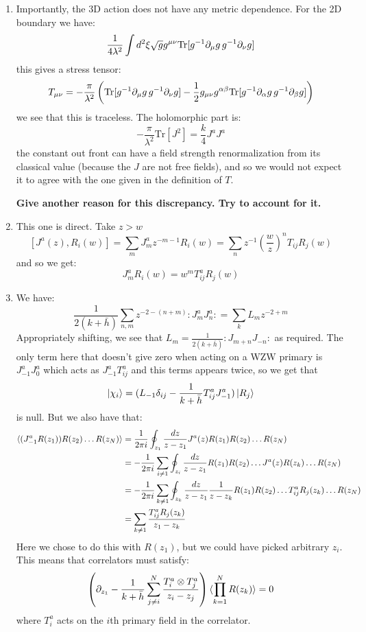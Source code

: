\documentclass[11pt]{article}
\begin{document}
\begin{enumerate}
	\item Importantly, the 3D action does not have any metric dependence. For the 2D boundary we have:
	\[
		\frac{1}{4 \lambda^2} \int d^2 \xi \sqrt{g} g^{\mu \nu} \mathrm{Tr}[g^{-1}\partial_\mu g\, g^{-1} \partial_\nu g]
	\]
	this gives a stress tensor:
	\[
		T_{\mu \nu} = - \frac{\pi}{\lambda^2} \left(\mathrm{Tr}[g^{-1}\partial_\mu g\, g^{-1} \partial_\nu g] - \frac12 g_{\mu \nu} g^{\alpha \beta} \mathrm{Tr}[g^{-1}\partial_\alpha g\, g^{-1} \partial_\beta g] \right)
	\]
	we see that this is traceless. The holomorphic part is:
	\[
		- \frac{\pi}{\lambda^2} \mathrm{Tr}[J^2] = \frac{k}{4} J^a J^a
	\]
	the constant out front can have a field strength renormalization from its classical value (because the $J$ are not free fields), and so we would not expect it to agree with the one given in the definition of $T$.
	
	\textbf{Give another reason for this discrepancy. Try to account for it.}
	
	\item This one is direct. Take $z > w$
	\[
		[J^a(z), R_i(w)] = \sum_{m} J^a_m z^{-m-1} R_i (w) = \sum_{n} z^{-1} \left(\frac wz \right)^n T_{ij} R_j(w)
	\]
	and so we get:
	\[
		J^a_m R_i(w) = w^m T^a_{ij} R_j(w)
	\]
	
	\item We have:
	\[
		\frac{1}{2(k+\bar h)} \sum_{n,m} z^{-2-(n+m)} :J^a_m J^a_n: = \sum_{k} L_m z^{-2 + m}
	\]
	Appropriately shifting, we see that $L_m = \frac{1}{2(k+\bar h)} :J_{m+n} J_{-n}:$ as required. The only term here that doesn't give zero when acting on a WZW primary is $J_{-1}^a J_0^a$ which acts as $J_{-1}^a T_{ij}^a$ and this terms appears twice, so we get that
	\[
		\ket{\chi_i} = (L_{-1} \delta_{ij} - \frac{1}{k + \bar h} T^a_{ij} J^a_{-1} ) \ket{R_j}
	\]
	is null. But we also have that:
	\[
	\begin{aligned}
		\braket{(J_{-1}^a R(z_1)) R(z_2) \dots R(z_N)} &= \frac{1}{2\pi i} \oint_{z_1} \frac{dz}{z-z_1} J^a(z) R(z_1) R(z_2) \dots R(z_N)\\
		&=  - \frac{1}{2\pi i} \sum_{i \neq 1} \oint_{z_i} \frac{dz}{z-z_1} R(z_1) R(z_2)\dots J^a(z) R(z_k) \dots R(z_N)\\
		&= - \frac{1}{2\pi i} \sum_{k \neq 1} \oint_{z_k} \frac{dz}{z-z_1} \frac{1}{z-z_k} R(z_1) R(z_2)\dots T^a_{ij} R_{j}(z_k) \dots R(z_N)\\
		&= \sum_{k \neq 1} \frac{T^a_{ij} R_j(z_k)}{z_1 - z_k}
	\end{aligned}
	\]
	Here we chose to do this with $R(z_1)$, but we could have picked arbitrary $z_i$. This means that correlators must satisfy:
	\[
		\left(\partial_{z_1} -   \frac{1}{k + \bar h} \sum_{j \neq i}^N \frac{T^a_i \otimes T^a_j}{z_i - z_j} \right) \braket{\prod_{k=1}^N R(z_k)} = 0
	\]
	where $T^a_i$ acts on the $i$th primary field in the correlator. 
	

\end{enumerate}
\end{document}
